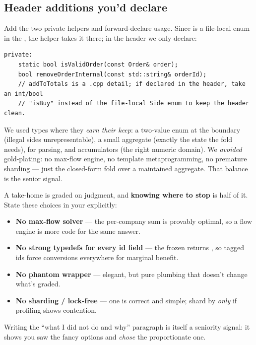 \subsection{Header additions you'd declare}

Add the two private helpers and forward-declare  usage. Since
 is a file-local enum in the , the helper takes it there;
in the header we only declare:

\begin{lstlisting}
private:
    static bool isValidOrder(const Order& order);
    bool removeOrderInternal(const std::string& orderId);
    // addToTotals is a .cpp detail; if declared in the header, take an int/bool
    // "isBuy" instead of the file-local Side enum to keep the header clean.
\end{lstlisting}

\begin{keybox}
We used types where they \emph{earn their keep}: a two-value  enum at
the boundary (illegal sides unrepresentable), a small  aggregate
(exactly the state the fold needs),  for parsing, and
 accumulators (the right numeric domain). We \emph{avoided}
gold-plating: no max-flow engine, no template metaprogramming, no premature
sharding --- just the closed-form fold over a maintained aggregate. That balance
is the senior signal.
\end{keybox}

\begin{pitfall}
A take-home is graded on judgment, and \textbf{knowing where to stop} is half of
it. State these choices in your  explicitly:
\begin{itemize}[leftmargin=1.3em,nosep]
  \item \textbf{No max-flow solver} --- the per-company sum is provably optimal, so
        a flow engine is more code for the same answer.
  \item \textbf{No strong typedefs for every id field} --- the frozen 
        returns , so tagged ids force conversions everywhere for
        marginal benefit.
  \item \textbf{No  phantom wrapper} --- elegant, but pure
        plumbing that doesn't change what's graded.
  \item \textbf{No sharding / lock-free} --- one  is correct
        and simple; shard by  \emph{only} if profiling shows
        contention.
\end{itemize}
Writing the ``what I did not do and why'' paragraph is itself a seniority signal:
it shows you saw the fancy options and \emph{chose} the proportionate one.
\end{pitfall}

